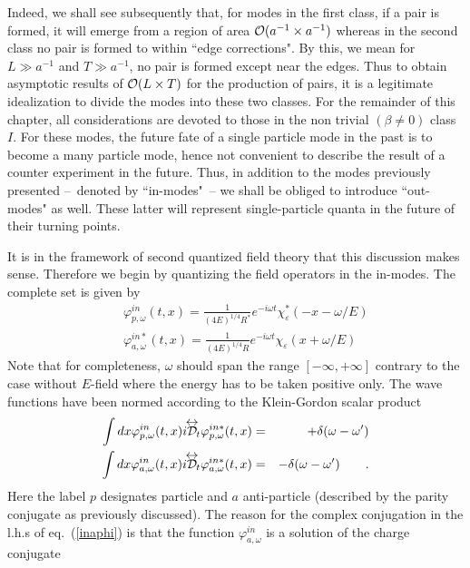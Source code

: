 \documentclass[12pt,oneside]{report}
\def\lrD{{{\cal D}\kern-.9em\raise1.75ex\hbox{$\leftrightarrow$}}\!}
\begin{document}
\par Indeed, we shall see subsequently  that, for modes in the first class,
if a
pair is formed, it will emerge from a region of area ${\cal O}(a^{-1}\times a^{-1})$
whereas
in the second class no pair is formed to within ``edge corrections". By
this, we mean 
for $L\gg a^{-1}$ and $T\gg a^{-1}$, no pair is formed except near the edges.
Thus to obtain
asymptotic results of ${\cal O}(L\times T)$ for the production of pairs, it is a
legitimate idealization to divide the modes into these two classes. For the
remainder
of this chapter, all considerations are devoted to those in the non trivial
$(\beta
\neq 0)$ class $I$. For these modes, the future fate of a single particle
mode in the
past is to become a many particle mode, hence not convenient 
to describe the result
of a counter experiment  in the future. Thus, in addition to the modes
previously
presented --~denoted by  ``in-modes"~-- we shall be obliged to introduce
``out-modes" as well. These latter will represent single-particle quanta
in the future of their turning points. 
\par It is in the framework of second quantized field theory that this discussion
makes sense. Therefore we begin by quantizing the field
operators in
the in-modes. The complete set is given by
\begin{eqnarray}
&& \varphi^{in}_{p,\omega}(t,x) =\frac{1}{(4 E)^{1/4} R^{*}} 
e^{-i\omega t}  \chi^{*}_{\varepsilon}(-x - \omega/E)
\label{inpphi} \\
&& \varphi^{in*}_{a,\omega}(t,x) =\frac{1}{(4 E)^{1/4} R}
 e^{-i \omega t} \chi_{\varepsilon} (x+\omega/E)
\label{inaphi}
\end{eqnarray}
Note that for completeness, $\omega$ should span the range $[-\infty, +\infty]$
 contrary to the case without $E$-field
where the energy has to be taken positive only.
The wave functions have been 
normed according to the Klein-Gordon scalar product
\begin{eqnarray}
\int dx \varphi^{in}_{p,\omega}(t,x) i{\lrD _t}\varphi^{in*}_{p,\omega}(t,x)
&=&+\delta(\omega-\omega^\prime)\nonumber\\
\int dx \varphi^{in}_{a,\omega}(t,x)i {\lrD _t}\varphi^{in*}_{a,\omega}(t,x)
&=&-\delta(\omega-\omega^\prime)\qquad.
\end{eqnarray}
Here the label $p$ designates particle and $a$ anti-particle (described
by the parity
conjugate as previously discussed). The reason for the complex conjugation
in the l.h.s of eq.~(\ref{inaphi}) is that
the function $\varphi^{in}_{a,\omega}$ is a solution of the charge conjugate 
\end{document}
